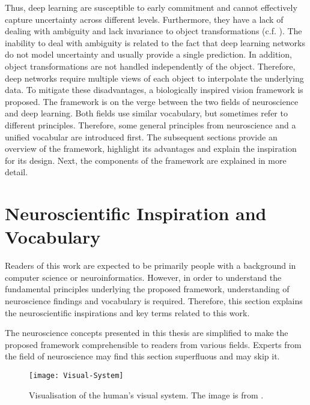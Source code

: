 Thus, deep learning are susceptible to early commitment and cannot effectively capture uncertainty across different levels. Furthermore, they have a lack of dealing with ambiguity and lack invariance to object transformations (c.f. ).
The inability to deal with ambiguity is related to the fact that deep learning networks do not model uncertainty and usually provide a single prediction. In addition, object transformations are not handled independently of the object. Therefore, deep networks require multiple views of each object to interpolate the underlying data.
To mitigate these disadvantages, a biologically inspired vision framework is proposed. 
The framework is on the verge between the two fields of neuroscience and deep learning.
Both fields use similar vocabulary, but sometimes refer to different principles. 
Therefore, some general principles from neuroscience and a unified vocabular are introduced first.
The subsequent sections provide an overview of the framework, highlight its advantages and explain the inspiration for its design. Next, the components of the framework are explained in more detail.



\section{Neuroscientific Inspiration and Vocabulary}
Readers of this work are expected to be primarily people with a background in computer science or neuroinformatics. However, in order to understand the fundamental principles underlying the proposed framework, understanding of neuroscience findings and vocabulary is required. Therefore, this section explains the neuroscientific inspirations and key terms related to this work.

The neuroscience concepts presented in this thesis are simplified to make the proposed framework comprehensible to readers from various fields. Experts from the field of neuroscience may find this section superfluous and may skip it.

\begin{figure}[h]
    \centering
    \texttt{[image: Visual-System]}
    \caption[Visualisation of the human's visual system]{Visualisation of the human's visual system. The image is from .}
\end{figure}

